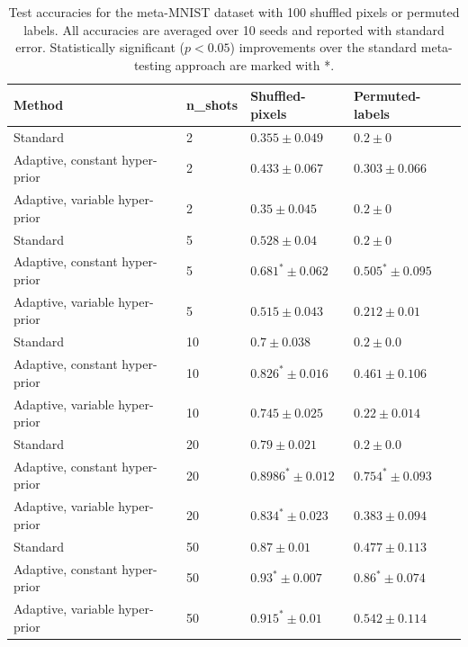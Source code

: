 \documentclass[letterpaper]{article} %
\theoremstyle{definition}
\begin{document}
\begin{table}[t]	
	
	\centering
	\begin{tabular}{llll}
		\toprule
		Method   & n\_shots  & Shuffled-pixels & Permuted-labels  \\
		\midrule
		Standard & 2   & $0.355\pm 0.049 $   & $0.2\pm 0 $   \\
		Adaptive, constant hyper-prior & 2   & $0.433\pm 0.067 $ & $0.303\pm 0.066 $ \\
		Adaptive, variable hyper-prior & 2   & $0.35\pm 0.045 $ & $0.2\pm 0 $ \\
		\midrule
		Standard & 5   & $0.528\pm 0.04 $   & $0.2\pm 0 $   \\
		Adaptive, constant hyper-prior & 5   & $0.681^*\pm 0.062 $ & $0.505^*\pm 0.095 $ \\
		Adaptive, variable hyper-prior & 5   & $0.515\pm 0.043 $ & $0.212\pm 0.01 $ \\
		\midrule
		Standard & 10   & $0.7\pm 0.038 $   & $0.2\pm 0.0 $   \\
		Adaptive, constant hyper-prior & 10   & $0.826^*\pm 0.016 $ & $0.461\pm 0.106 $ \\
		Adaptive, variable hyper-prior & 10   & $0.745\pm 0.025 $ & $0.22\pm 0.014 $ \\
		\midrule
		Standard & 20   & $0.79\pm 0.021 $   & $0.2\pm 0.0 $   \\
		Adaptive, constant hyper-prior & 20   & $0.8986^*\pm 0.012 $ & $0.754^*\pm 0.093 $ \\
		Adaptive, variable hyper-prior & 20   & $0.834^*\pm 0.023 $ & $0.383\pm 0.094 $ \\
		\midrule
		Standard & 50   & $0.87\pm 0.01 $   & $0.477\pm 0.113 $   \\
		Adaptive, constant hyper-prior & 50   & $0.93^*\pm 0.007 $ & $0.86^*\pm 0.074 $ \\
		Adaptive, variable hyper-prior & 50   & $0.915^*\pm 0.01 $ & $0.542\pm 0.114 $ \\
		\midrule
		\bottomrule
	\end{tabular}
	\caption{Test accuracies for the meta-MNIST dataset with 100 shuffled pixels or permuted labels. All accuracies are averaged over 10 seeds and reported with standard error. Statistically significant ($p<0.05$) improvements over the standard meta-testing approach are marked with *.}
	\label{table:gamma}
\end{table}
\end{document}
